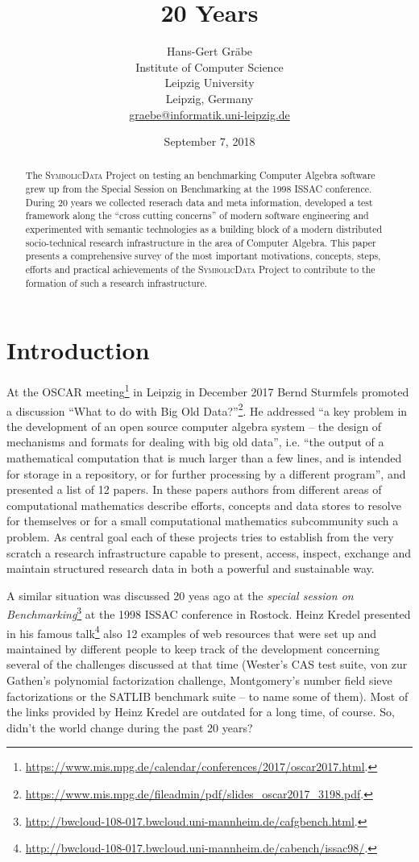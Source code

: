 \documentclass[12pt]{article}
\title{20 Years {\SD}}
\author{Hans-Gert Gr\"abe\\ Institute of Computer Science\\ Leipzig
  University\\ Leipzig, Germany\\\url{graebe@informatik.uni-leipzig.de}}
\date{September 7, 2018}
\def\SD{\textsc{Sym\-bolic\-Data}}
\begin{document}
\maketitle

\begin{abstract}
  The {\SD} Project on testing an benchmarking Computer Algebra software grew
  up from the Special Session on Benchmarking at the 1998 ISSAC conference.
  During 20 years we collected reserach data and meta information, developed a
  test framework along the ``cross cutting concerns'' of modern software
  engineering and experimented with semantic technologies as a building block
  of a modern distributed socio-technical research infrastructure in the area
  of Computer Algebra. This paper presents a comprehensive survey of the most
  important motivations, concepts, steps, efforts and practical achievements of
  the {\SD} Project to contribute to the formation of such a research
  infrastructure.
\end{abstract}

\section{Introduction}

At the OSCAR
meeting\footnote{\url{https://www.mis.mpg.de/calendar/conferences/2017/oscar2017.html}.}
in Leipzig in December 2017 Bernd Sturmfels promoted a discussion ``What to do
with Big Old
Data?''\footnote{\url{https://www.mis.mpg.de/fileadmin/pdf/slides_oscar2017_3198.pdf}.}.
He addressed ``a key problem in the development of an open source computer
algebra system -- the design of mechanisms and formats for dealing with big old
data'', i.e. ``the output of a mathematical computation that is much larger
than a few lines, and is intended for storage in a repository, or for further
processing by a different program'', and presented a list of 12 papers. In
these papers authors from different areas of computational mathematics describe
efforts, concepts and data stores to resolve for themselves or for a small
computational mathematics subcommunity such a problem.  As central goal each of
these projects tries to establish from the very scratch a research
infrastructure capable to present, access, inspect, exchange and maintain
structured research data in both a powerful and sustainable way.

A similar situation was discussed 20 yeas ago at the \emph{special session on
  Benchmarking}\footnote{\url{http://bwcloud-108-017.bwcloud.uni-mannheim.de/cafgbench.html}.}
at the 1998 ISSAC conference in Rostock.  Heinz Kredel presented in his famous
talk\footnote{\url{http://bwcloud-108-017.bwcloud.uni-mannheim.de/cabench/issac98/}.}
also 12 examples of web resources that were set up and maintained by different
people to keep track of the development concerning several of the challenges
discussed at that time (Wester's CAS test suite, von zur Gathen's polynomial
factorization challenge, Montgomery's number field sieve factorizations or the
SATLIB benchmark suite -- to name some of them). Most of the links provided by
Heinz Kredel are outdated for a long time, of course.  So, didn't the world
change during the past 20 years?
\end{document}
